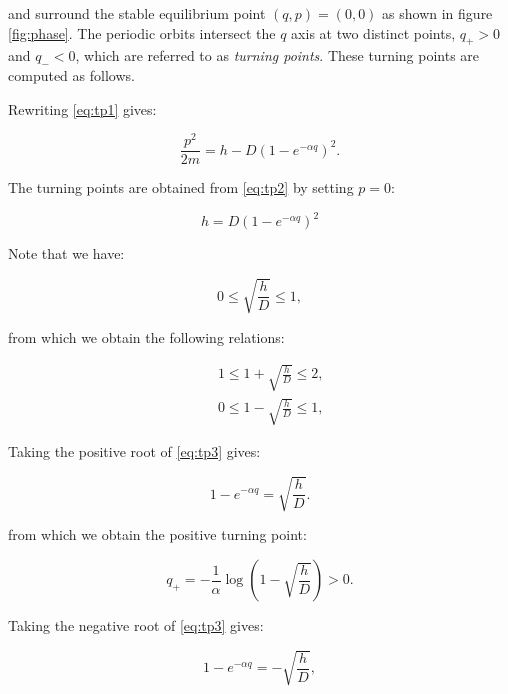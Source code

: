 \documentclass{ws-ijbc}
\begin{document}
\noindent
and surround the stable equilibrium point $(q, p) = (0, 0)$ as shown in figure \ref{fig:phase}. The periodic orbits intersect the $q$ axis at two distinct points, $q_+ > 0$ and $q_- <0$,  which are referred to as {\em turning points}. These turning points are computed as follows.

Rewriting \eqref{eq:tp1} gives:



\begin{equation}
\frac{p^2}{2m} = h- D \left( 1-e^{-\alpha q} \right)^2.
\label{eq:tp2}
\end{equation}

\noindent
The turning points are obtained from \eqref{eq:tp2} by setting $p=0$:

\begin{equation}
h=D \left( 1-e^{-\alpha q} \right)^2
\label{eq:tp3}
\end{equation}

\noindent
Note that we have:

\begin{equation}
0 \le \sqrt{\frac{h}{D}} \le 1,
\label{eq:tp4}
\end{equation}

\noindent
from which we obtain the following relations: 


\begin{eqnarray}
&& 1 \le 1 + \sqrt{\frac{h}{D}} \le 2, \label{eq:tp5} \\
&& 0 \le 1 -  \sqrt{\frac{h}{D}} \le 1, \label{eq:tp6}
\end{eqnarray}


Taking the positive root of \eqref{eq:tp3} gives:

\begin{equation}
1-e^{-\alpha q} =  \sqrt{\frac{h}{D}}.
\label{eq:tp7}
\end{equation}

\noindent
from which we obtain the positive turning point:

\begin{equation}
q_+ = - \frac{1}{\alpha} \log \left(1-  \sqrt{\frac{h}{D}}  \right) > 0.
\label{eq:tppos}
\end{equation}

\noindent
Taking the negative root of \eqref{eq:tp3} gives:

\begin{equation}
1-e^{-\alpha q} = -\sqrt{\frac{h}{D}},
\label{eq:tp8}
\end{equation}
\end{document}
